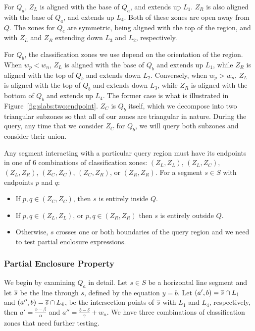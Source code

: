 For $Q_a$, $Z_L$ is aligned with the base of $Q_a$, and extends up $L_1$. 
$Z_R$ is also aligned with the base of $Q_a$, and extends up $L_4$.
Both of these zones are open away from $Q$.
The zones for $Q_c$ are symmetric, being aligned with the top of the region, and with $Z_L$ and $Z_R$ extending down $L_3$ and $L_2$, respectively.

For $Q_b$, the classification zones we use depend on the orientation of the region.
When $w_p < w_n$, $Z_L$ is aligned with the base of $Q_b$ and extends up $L_1$, while $Z_R$ is aligned with the top of $Q_b$ and extends down $L_2$.
Conversely, when $w_p > w_n$, $Z_L$ is aligned with the top of $Q_b$ and extends down $L_3$, while $Z_R$ is aligned with the bottom of $Q_b$ and extends up $L_4$.
The former case is what is illustrated in Figure~\ref{fig:slabs:two:endpoint}.
$Z_C$ is $Q_b$ itself, which we decompose into two triangular subzones so that all of our zones are triangular in nature.
During the query, any time that we consider $Z_C$ for $Q_b$, we will query both subzones and consider their union.

Any segment interacting with a particular query region must have its endpoints in one of 6 combinations of classification zones: $(Z_L, Z_L)$, $(Z_L, Z_C)$, $(Z_L, Z_R)$, $(Z_C,\allowbreak Z_C)$, $(Z_C, Z_R)$, or $(Z_R, Z_R)$. 
For a segment $s \in S$ with endpoints $p$ and $q$:
\begin{itemize}
\item If $p, q \in (Z_C, Z_C)$, then $s$ is entirely inside $Q$.
\item If $p, q \in (Z_L, Z_L)$, or $p, q \in (Z_R, Z_R)$ then $s$ is entirely outside $Q$.
\item Otherwise, $s$ crosses one or both boundaries of the query region and we need to test partial enclosure expressions.
\end{itemize}


\subsubsection{Partial Enclosure Property}

We begin by examining $Q_a$ in detail.
Let $s \in S$ be a horizontal line segment and let $\overline{s}$ be the line through $s$, defined by the equation $y = b$.
Let $(a', b) = \overline{s} \cap L_1$ and $(a'', b) = \overline{s} \cap L_4$, be the intersection points of $\overline{s}$ with $L_1$ and $L_4$, respectively, then $a' = \frac{b - \beta}{\alpha}$ and $a'' = \frac{b - \delta}{\gamma} + w_n$.
We have three combinations of classification zones that need further testing.

